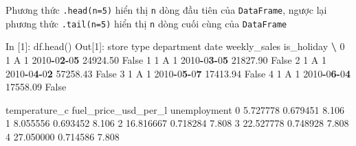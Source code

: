 \documentclass[
]{book}
\newenvironment{Shaded}{\begin{snugshade}}{\end{snugshade}}
\newcommand{\BuiltInTok}[1]{#1}
\newcommand{\DecValTok}[1]{\textcolor[rgb]{0.00,0.00,0.81}{#1}}
\newcommand{\ErrorTok}[1]{\textcolor[rgb]{0.64,0.00,0.00}{\textbf{#1}}}
\newcommand{\FloatTok}[1]{\textcolor[rgb]{0.00,0.00,0.81}{#1}}
\newcommand{\NormalTok}[1]{#1}
\newcommand{\OperatorTok}[1]{\textcolor[rgb]{0.81,0.36,0.00}{\textbf{#1}}}
\newcommand{\VariableTok}[1]{\textcolor[rgb]{0.00,0.00,0.00}{#1}}
\begin{document}
Phương thức \texttt{.head(n=5)} hiển thị \texttt{n} dòng đầu tiên của \texttt{DataFrame}, ngược lại phương thức \texttt{.tail(n=5)} hiển thị \texttt{n} dòng cuối cùng của \texttt{DataFrame}

\begin{Shaded}
\begin{Highlighting}[]
\NormalTok{In [}\DecValTok{1}\NormalTok{]: df.head()}
\NormalTok{Out[}\DecValTok{1}\NormalTok{]:    }
\NormalTok{        store }\BuiltInTok{type}\NormalTok{  department        date  weekly\_sales  is\_holiday  }\OperatorTok{\textbackslash{}}
\DecValTok{0}      \DecValTok{1}\NormalTok{    A           }\DecValTok{1}  \DecValTok{2010}\OperatorTok{{-}}\DecValTok{0}\ErrorTok{2}\OperatorTok{{-}}\DecValTok{0}\ErrorTok{5}      \FloatTok{24924.50}       \VariableTok{False}   
\DecValTok{1}      \DecValTok{1}\NormalTok{    A           }\DecValTok{1}  \DecValTok{2010}\OperatorTok{{-}}\DecValTok{0}\ErrorTok{3}\OperatorTok{{-}}\DecValTok{0}\ErrorTok{5}      \FloatTok{21827.90}       \VariableTok{False}   
\DecValTok{2}      \DecValTok{1}\NormalTok{    A           }\DecValTok{1}  \DecValTok{2010}\OperatorTok{{-}}\DecValTok{0}\ErrorTok{4}\OperatorTok{{-}}\DecValTok{0}\ErrorTok{2}      \FloatTok{57258.43}       \VariableTok{False}   
\DecValTok{3}      \DecValTok{1}\NormalTok{    A           }\DecValTok{1}  \DecValTok{2010}\OperatorTok{{-}}\DecValTok{0}\ErrorTok{5}\OperatorTok{{-}}\DecValTok{0}\ErrorTok{7}      \FloatTok{17413.94}       \VariableTok{False}   
\DecValTok{4}      \DecValTok{1}\NormalTok{    A           }\DecValTok{1}  \DecValTok{2010}\OperatorTok{{-}}\DecValTok{0}\ErrorTok{6}\OperatorTok{{-}}\DecValTok{0}\ErrorTok{4}      \FloatTok{17558.09}       \VariableTok{False} 

\NormalTok{   temperature\_c  fuel\_price\_usd\_per\_l  unemployment  }
\DecValTok{0}       \FloatTok{5.727778}              \FloatTok{0.679451}         \FloatTok{8.106}  
\DecValTok{1}       \FloatTok{8.055556}              \FloatTok{0.693452}         \FloatTok{8.106}  
\DecValTok{2}      \FloatTok{16.816667}              \FloatTok{0.718284}         \FloatTok{7.808}  
\DecValTok{3}      \FloatTok{22.527778}              \FloatTok{0.748928}         \FloatTok{7.808}  
\DecValTok{4}      \FloatTok{27.050000}              \FloatTok{0.714586}         \FloatTok{7.808}  


\end{Highlighting}
\end{Shaded}
\end{document}
